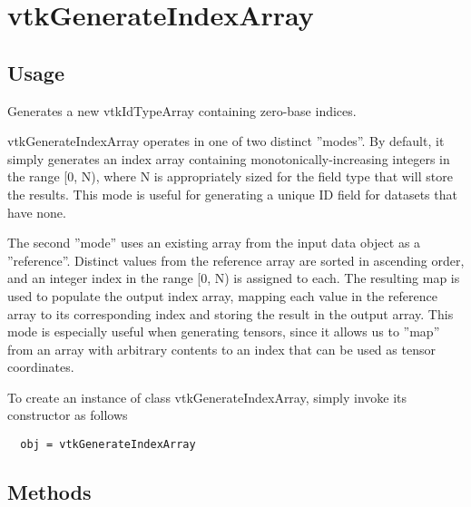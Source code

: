 \section{vtkGenerateIndexArray}

\subsection{Usage}

 Generates a new vtkIdTypeArray containing zero-base indices.

 vtkGenerateIndexArray operates in one of two distinct ''modes''.
 By default, it simply generates an index array containing
 monotonically-increasing integers in the range [0, N), where N
 is appropriately sized for the field type that will store the
 results.  This mode is useful for generating a unique ID field
 for datasets that have none.

 The second ''mode'' uses an existing array from the input data
 object as a ''reference''.  Distinct values from the reference
 array are sorted in ascending order, and an integer index in
 the range [0, N) is assigned to each.  The resulting map is
 used to populate the output index array, mapping each value
 in the reference array to its corresponding index and storing
 the result in the output array.  This mode is especially
 useful when generating tensors, since it allows us to ''map''
 from an array with arbitrary contents to an index that can
 be used as tensor coordinates.

To create an instance of class vtkGenerateIndexArray, simply
invoke its constructor as follows
\begin{verbatim}
  obj = vtkGenerateIndexArray
\end{verbatim}
\subsection{Methods}

